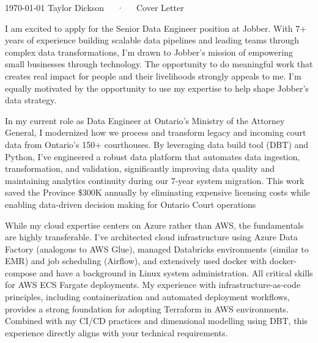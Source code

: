 \documentclass[11pt, letterpaper]{awesome-cv}
\begin{document}
\makecvheader[R]

\makecvfooter%
  {\today}
  {Taylor Dickson~~~·~~~Cover Letter}
  {}

\makelettertitle%

\begin{cvletter}
I am excited to apply for the Senior Data Engineer position at Jobber. With 7+ years of experience building scalable data pipelines and leading teams through complex data transformations, I'm drawn to Jobber's mission of empowering small businesses through technology. The opportunity to do meaningful work that creates real impact for people and their livelihoods strongly appeals to me. I'm equally motivated by the opportunity to use my expertise to help shape Jobber's data strategy.

In my current role as Data Engineer at Ontario's Ministry of the Attorney General, I modernized how we process and transform legacy and incoming court data from Ontario's 150+ courthouses. By leveraging data build tool (DBT) and Python, I've engineered a robust data platform that automates data ingestion, transformation, and validation, significantly improving data quality and maintaining analytics continuity during our 7-year system migration. This work saved the Province \$300K annually by eliminating expensive licensing costs while enabling data-driven decision making for Ontario Court operations

While my cloud expertise centers on Azure rather than AWS, the fundamentals are highly transferable. I've architected cloud infrastructure using Azure Data Factory (analogous to AWS Glue), managed Databricks environments (similar to EMR) and job scheduling (Airflow), and extensively used docker with docker-compose and have a background in Linux system administration. All critical skills for AWS ECS Fargate deployments. My experience with infrastructure-as-code principles, including containerization and automated deployment workflows, provides a strong foundation for adopting Terraform in AWS environments. Combined with my CI/CD practices and dimensional modelling using DBT, this experience directly aligns with your technical requirements.


\end{cvletter}
\end{document}
